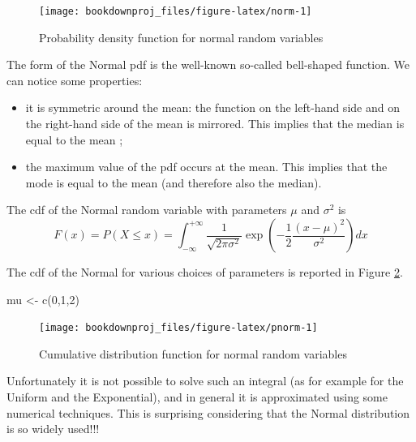 \documentclass[
]{book}
\newenvironment{Shaded}{\begin{snugshade}}{\end{snugshade}}
\newcommand{\DecValTok}[1]{\textcolor[rgb]{0.00,0.00,0.81}{#1}}
\newcommand{\FunctionTok}[1]{\textcolor[rgb]{0.00,0.00,0.00}{#1}}
\newcommand{\NormalTok}[1]{#1}
\newcommand{\OtherTok}[1]{\textcolor[rgb]{0.56,0.35,0.01}{#1}}
\begin{document}
\begin{figure}

{\centering \texttt{[image: bookdownproj\_files/figure-latex/norm-1]} 

}

\caption{Probability density function for normal random variables}\label{fig:norm}
\end{figure}

The form of the Normal pdf is the well-known so-called bell-shaped function. We can notice some properties:

\begin{itemize}
\item
  it is symmetric around the mean: the function on the left-hand side and on the right-hand side of the mean is mirrored. This implies that the median is equal to the mean ;
\item
  the maximum value of the pdf occurs at the mean. This implies that the mode is equal to the mean (and therefore also the median).
\end{itemize}

The cdf of the Normal random variable with parameters \(\mu\) and \(\sigma^2\) is
\[
F(x) = P(X\leq x)=\int_{-\infty}^{+\infty}\frac{1}{\sqrt{2\pi\sigma^2}}\exp\left(-\frac{1}{2}\frac{(x-\mu)^2}{\sigma^2}\right)dx
\]

The cdf of the Normal for various choices of parameters is reported in Figure \ref{fig:pnorm}.

\begin{Shaded}
\begin{Highlighting}[]
\NormalTok{mu }\OtherTok{\textless{}{-}} \FunctionTok{c}\NormalTok{(}\DecValTok{0}\NormalTok{,}\DecValTok{1}\NormalTok{,}\DecValTok{2}\NormalTok{)}
\end{Highlighting}
\end{Shaded}

\begin{figure}

{\centering \texttt{[image: bookdownproj\_files/figure-latex/pnorm-1]} 

}

\caption{Cumulative distribution function for normal random variables}\label{fig:pnorm}
\end{figure}

Unfortunately it is not possible to solve such an integral (as for example for the Uniform and the Exponential), and in general it is approximated using some numerical techniques. This is surprising considering that the Normal distribution is so widely used!!!
\end{document}
